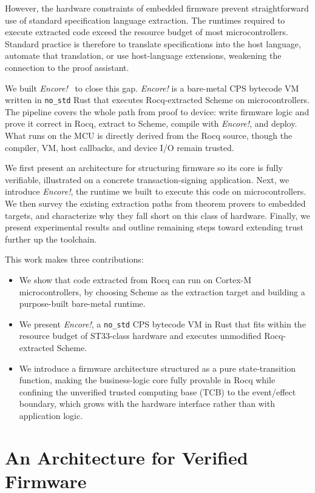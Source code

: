 \documentclass[runningheads]{llncs}
\newcommand{\encore}{\textit{Encore!}}
\newcommand{\code}[1]{\texttt{#1}}
\begin{document}
However, the hardware constraints of embedded firmware prevent straightforward use of standard specification language extraction.
The runtimes required to execute extracted code exceed the resource budget of most microcontrollers.
Standard practice is therefore to translate specifications into the host language, automate that translation, or use host-language extensions, weakening the connection to the proof assistant.

We built \encore{}~\cite{encore} to close this gap.
\encore{} is a bare-metal CPS bytecode VM written in \code{no\_std} Rust that executes Rocq-extracted Scheme on microcontrollers.
The pipeline covers the whole path from proof to device: write firmware logic and prove it correct in Rocq, extract to Scheme, compile with \encore, and deploy.
What runs on the MCU is directly derived from the Rocq source, though the compiler, VM, host callbacks, and device I/O remain trusted.

We first present an architecture for structuring firmware so its core is fully verifiable, illustrated on a concrete transaction-signing application.
Next, we introduce \encore{}, the runtime we built to execute this code on microcontrollers.
We then survey the existing extraction paths from theorem provers to embedded targets, and characterize why they fall short on this class of hardware.
Finally, we present experimental results and outline remaining steps toward extending trust further up the toolchain.

This work makes three contributions:
\begin{itemize}
  \item We show that code extracted from Rocq can run on Cortex-M microcontrollers, by choosing Scheme as the extraction target and building a purpose-built bare-metal runtime.
  \item We present \encore, a \code{no\_std} CPS bytecode VM in Rust that fits within the resource budget of ST33-class hardware and executes unmodified Rocq-extracted Scheme.
  \item We introduce a firmware architecture structured as a pure state-transition function, making the business-logic core fully provable in Rocq while confining the unverified trusted computing base (TCB) to the event/effect boundary, which grows with the hardware interface rather than with application logic.
\end{itemize}

\section{An Architecture for Verified Firmware}
\label{sec:firmware}
\end{document}
